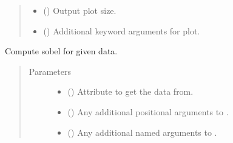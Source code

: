 \documentclass[letterpaper,10pt,english]{sphinxmanual}
\begin{document}
\begin{fulllineitems}
\begin{fulllineitems}
\begin{quote}
\begin{description}
\begin{itemize}
\item {} 
 (\sphinxstyleliteralemphasis{\sphinxupquote{, }}) \textendash{} Output plot size.

\item {} 
 (\sphinxstyleliteralemphasis{\sphinxupquote{, }}) \textendash{} Additional keyword arguments for plot.

\end{itemize}

\end{description}\end{quote}

\end{fulllineitems}


\begin{fulllineitems}
\label{\detokenize{api/base_classes:geology.src.base_spatial.SpatialComponent.sobel}}
Compute sobel for given data.
\begin{quote}\begin{description}
\item[{Parameters}] \leavevmode\begin{itemize}
\item {} 
 (\sphinxstyleliteralemphasis{\sphinxupquote{, }}) \textendash{} Attribute to get the data from.

\item {} 
 () \textendash{} Any additional positional arguments to .

\item {} 
 () \textendash{} Any additional named arguments to .


\end{itemize}
\end{description}
\end{quote}
\end{fulllineitems}
\end{fulllineitems}
\end{document}

